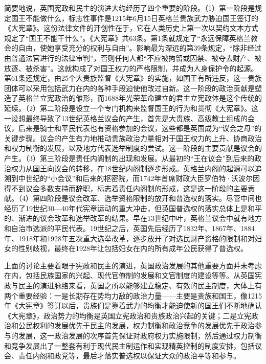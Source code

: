 简要地说，英国宪政和民主的演进大约经历了四个重要的阶段。（1）第一阶段是规定国王不能做什么，标志性事件是1215年6月15日英格兰贵族武力胁迫国王签订的《大宪章》。这份法律文件的开创性在于，它在人类历史上第一次以契约文本方式规定了“国王不能干什么”。《大宪章》共63条。第1条就规定了“永远保障英格兰教会的自由，使她享受充分的权利与自由”。影响最为深远的第39条规定，“除非经过由普通法官进行的法律审判”，否则任何人都“不应被拘留或囚禁、被夺去财产、被放逐、被杀害”。这就构成了对国王权力的严格限制，并成为人身保护令的起源。第61条还规定，由25个大贵族监督《大宪章》的实施，如国王有所违反，这一贵族团体可以采用包括武力在内的各种手段迫使他改过自新。这一阶段的政治贡献是塑造了英格兰立宪政治的雏形，而1688年光荣革命建立的君主立宪政体是这个传统的延续。（2）第二阶段是设立一个专门机构来监督国王的行为和贯彻《大宪章》。这一设想最终导致了13世纪英格兰议会的产生，首先是大贵族、高级教士组成的会议，后来是骑士和平民代表也有资格参加的会议，这些都是英国成为“议会之母”的关键步骤。议会的产生有力地推动贵族政治力量相对于国王权力的上升、协商政治和权力制衡的发展，以及地方代表选举制度的尝试。这一阶段的主要贡献是议会的产生。（3）第三阶段是责任内阁制的出现和发展。从最初的“王在议会”到后来的政治权力从国王向议会的转移，在18世纪内阁制逐步形成。英格兰内阁的起源可以追溯到中世纪的“小会议”和后来的枢密院，而1742年首席财政大臣罗伯特·沃波尔因得不到议会多数支持而辞职，标志着责任内阁制的形成，这是这一阶段的主要贡献。（4）第四阶段是议会改革、选举资格限制的放开和普选权的落实。尽管中间也经历了19世纪30—40年代宪章运动的重大冲击，但英国普选权的落实总体上是和平的、渐进的议会改革和选举改革的结果。早在13世纪中叶，英格兰议会中就有地方和自治市选派的平民代表。19世纪之后，英国先后经历了1832年、1867年、1884年、1918年和1928年五次重大选举改革，逐步放开了对选民财产资格的限制和对妇女的性别歧视，最终在1928年让包括妇女在内的所有成年公民获得了普选权。

上面的讨论主要着眼于宪政和民主的演进，英国政治发展的其他重要方面并未考虑在内，包括民族国家的兴起、现代官僚制的发展和文官制度的建设等等。从英国宪政与民主的演进脉络来看，英国之所以能够建立稳定、有效的民主制度，大体上有两个重要经验：一是长期存在势均力敌的政治力量——主要是贵族和国王，像1215年《大宪章》签订以后，贵族们是靠着武力的均衡才能迫使新的国王们不断地确认《大宪章》，政治势力的均衡是英国立宪政治和贵族政治兴起的关键；二是立宪政治和公民权利的发展优先于民主的发展，权力制衡和政治竞争的发展优先于政治参与的发展，这一政治发展的次序首先保证对政府权力实施限制，然后通过权力制衡和竞争发展出了一整套有利于现代民主制运作和实现精英控制的制度安排，包括议会、责任内阁和政党等，最后才落实普选权以保证大众的政治平等和参与。


